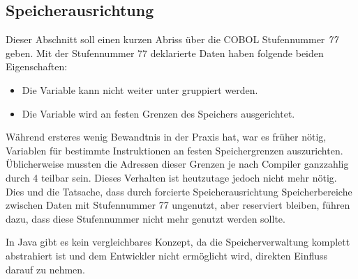 \subsection{Speicherausrichtung}
Dieser Abschnitt soll einen kurzen Abriss über die COBOL Stufennummer \textit{77} geben. Mit der Stufennummer 77 deklarierte Daten haben folgende beiden Eigenschaften:

\begin{itemize}
    \item Die Variable kann nicht weiter unter gruppiert werden.
    \item Die Variable wird an festen Grenzen des Speichers ausgerichtet.
\end{itemize}

Während ersteres wenig Bewandtnis in der Praxis hat, war es früher nötig, Variablen für bestimmte Instruktionen an festen Speichergrenzen auszurichten. Üblicherweise mussten die Adressen dieser Grenzen je nach Compiler ganzzahlig durch 4  teilbar sein. Dieses Verhalten ist heutzutage jedoch nicht mehr nötig. Dies und die Tatsache, dass durch forcierte Speicherausrichtung Speicherbereiche zwischen Daten mit Stufennummer 77 ungenutzt, aber reserviert bleiben, führen dazu, dass diese Stufennummer nicht mehr genutzt werden sollte.

In Java gibt es kein vergleichbares Konzept, da die Speicherverwaltung komplett abstrahiert ist und dem Entwickler nicht ermöglicht wird, direkten Einfluss darauf zu nehmen.